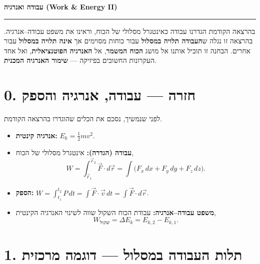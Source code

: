 \documentclass[12pt, a4paper]{article}
\newcommand{\hvec}[1]{\overrightarrow{#1}}
\begin{document}

\begin{center}
  {\LARGE\bfseries עבודה ואנרגיה \textenglish{(Work \& Energy II)}}\\[6pt]
  \rule{\linewidth}{0.8pt}
\end{center}
\vspace{0.5cm}

בהרצאה הקודמת הגדרנו עבודה כאינטגרל מסלולי של הכוח, וראינו את משפט עבודה--אנרגיה. בהרצאה זו נגלה ש\textbf{העבודה תלויה במסלול} עבור כוחות מסוימים אך \textbf{אינה תלויה במסלול} עבור אחרים. הבחנה זו תוביל אותנו אל מושג \textbf{הכוח המשמר}, אל \textbf{האנרגיה הפוטנציאלית}, ואל אחד העקרונות החשובים בפיזיקה --- \textbf{שימור האנרגיה המכנית}.

\section*{0. חזרה --- עבודה, אנרגיה והספק}

לפני שנמשיך, נסכם את הכלים שהוגדרו בהרצאה הקודמת.

\begin{tcolorbox}[notebox, title={תקציר ההרצאה הקודמת}]
\begin{itemize}
  \item \textbf{אנרגיה קינטית:} \quad \textenglish{$E_k = \tfrac{1}{2} m v^2$}.
  \item \textbf{עבודה (הגדרה):} אינטגרל מסלולי של הכוח,
        \[
          W = \int_{\hvec{r}_1}^{\hvec{r}_2} \hvec{F}\cdot d\hvec{r}
            = \int \bigl(F_x\,dx + F_y\,dy + F_z\,dz\bigr).
        \]
  \item \textbf{הספק:} \quad
        \textenglish{$W = \displaystyle\int_{t_1}^{t_2} P\,dt
                          = \int \hvec{F}\cdot\hvec{v}\,dt
                          = \int \hvec{F}\cdot d\hvec{r}$}.
  \item \textbf{משפט עבודה--אנרגיה:} עבודת הכוח השקול שווה לשינוי האנרגיה הקינטית,
        \[
          W_{\text{שקול}} = \Delta E_k = E_{k,2} - E_{k,1}.
        \]
\end{itemize}
\end{tcolorbox}

\section*{1. תלות העבודה במסלול --- דוגמה מרכזית}
\end{document}
